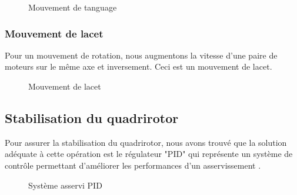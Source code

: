 \begin{figure}[H] 
\begin{center}
	\centering
\end{center}
\caption{Mouvement de tanguage}
\end{figure}

\subsubsection{Mouvement de lacet}
Pour un mouvement de rotation, nous augmentons la vitesse d'une paire de moteurs sur le même axe et inversement. Ceci est un mouvement de lacet.
\begin{figure} [H]
\begin{center}
\end{center}
\caption{Mouvement de lacet}	
\end{figure}
\subsection {Stabilisation du quadrirotor}
Pour assurer la stabilisation du quadrirotor, nous avons trouvé que la solution adéquate à cette opération est le régulateur "PID" qui représente un système de contrôle permettant d’améliorer les performances d'un asservissement \cite{Wikipideab}.
\begin{figure}[H] 
\begin{center}
	\centering
\end{center}
\caption{Système asservi PID}
\end{figure}


